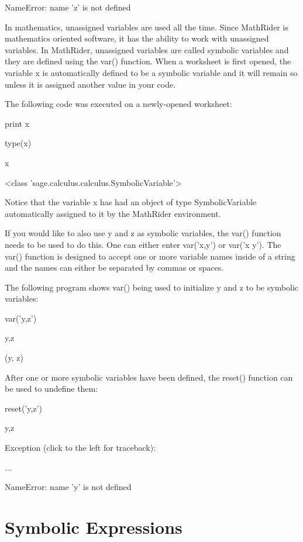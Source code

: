 \documentclass[12pt,oneside]{book}
\begin{document}
NameError: name 'z' is not defined


In mathematics, {\textquotedbl}unassigned variables{\textquotedbl} are used all the time. Since MathRider is mathematics oriented software, it has the ability to work with unassigned variables. In MathRider, unassigned variables are called symbolic variables and they are defined using the var() function. When a worksheet is first opened, the variable x is automatically defined to be a symbolic variable and it will remain so unless it is assigned another value in your code. 

The following code was executed on a newly{}-opened worksheet:


print x

type(x)

{\textbar}

x

{\textless}class 'sage.calculus.calculus.SymbolicVariable'{\textgreater}

Notice that the variable x has had an object of type SymbolicVariable automatically assigned to it by the MathRider environment. 

If you would like to also use y and z as symbolic variables, the var() function needs to be used to do this. One can either enter var('x,y') or var('x y'). The var() function is designed to accept one or more variable names inside of a string and the names can either be separated by commas or spaces. 

The following program shows var() being used to initialize y and z to be symbolic variables: 

var('y,z')

y,z

{\textbar}

(y, z)

After one or more symbolic variables have been defined, the reset() function can be used to undefine them: 

reset('y,z')

y,z

{\textbar}

Exception (click to the left for traceback):

...

NameError: name 'y' is not defined

\section[Symbolic Expressions]{Symbolic Expressions}
\end{document}
